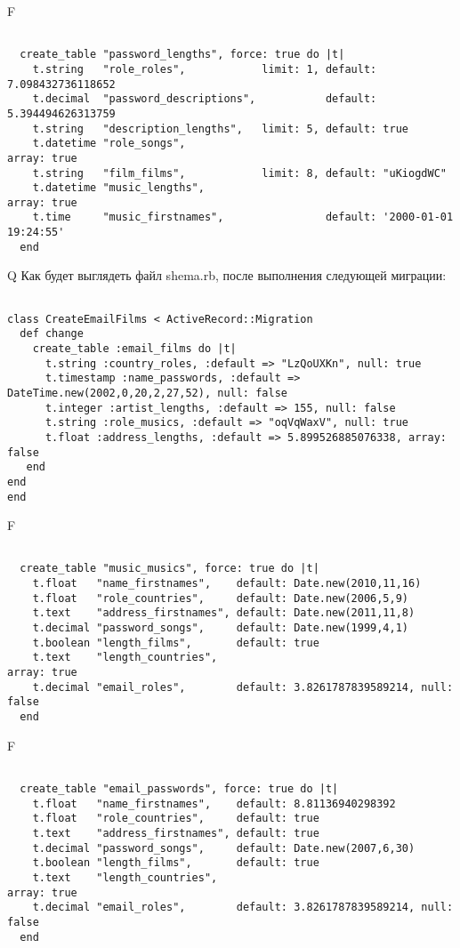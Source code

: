 F
\begin{verbatim}

  create_table "password_lengths", force: true do |t|
    t.string   "role_roles",            limit: 1, default: 7.098432736118652
    t.decimal  "password_descriptions",           default: 5.394494626313759
    t.string   "description_lengths",   limit: 5, default: true
    t.datetime "role_songs",                                                      array: true
    t.string   "film_films",            limit: 8, default: "uKiogdWC"
    t.datetime "music_lengths",                                                   array: true
    t.time     "music_firstnames",                default: '2000-01-01 19:24:55'
  end

\end{verbatim}

Q
Как будет выглядеть файл shema.rb, после выполнения следующей миграции:

\begin{verbatim}

class CreateEmailFilms < ActiveRecord::Migration 
  def change 
    create_table :email_films do |t| 
      t.string :country_roles, :default => "LzQoUXKn", null: true
      t.timestamp :name_passwords, :default => DateTime.new(2002,0,20,2,27,52), null: false
      t.integer :artist_lengths, :default => 155, null: false
      t.string :role_musics, :default => "oqVqWaxV", null: true
      t.float :address_lengths, :default => 5.899526885076338, array: false
   end
end
end
\end{verbatim}

F
\begin{verbatim}

  create_table "music_musics", force: true do |t|
    t.float   "name_firstnames",    default: Date.new(2010,11,16)
    t.float   "role_countries",     default: Date.new(2006,5,9)
    t.text    "address_firstnames", default: Date.new(2011,11,8)
    t.decimal "password_songs",     default: Date.new(1999,4,1)
    t.boolean "length_films",       default: true
    t.text    "length_countries",                                             array: true
    t.decimal "email_roles",        default: 3.8261787839589214, null: false
  end

\end{verbatim}

F
\begin{verbatim}

  create_table "email_passwords", force: true do |t|
    t.float   "name_firstnames",    default: 8.81136940298392
    t.float   "role_countries",     default: true
    t.text    "address_firstnames", default: true
    t.decimal "password_songs",     default: Date.new(2007,6,30)
    t.boolean "length_films",       default: true
    t.text    "length_countries",                                             array: true
    t.decimal "email_roles",        default: 3.8261787839589214, null: false
  end

\end{verbatim}

